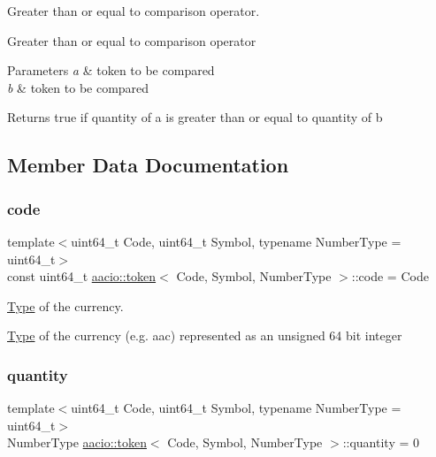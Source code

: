 Greater than or equal to comparison operator. 

Greater than or equal to comparison operator 
\begin{DoxyParams}{Parameters}
{\em a} & token to be compared \\
\hline
{\em b} & token to be compared \\
\hline
\end{DoxyParams}
\begin{DoxyReturn}{Returns}
true if quantity of a is greater than or equal to quantity of b 
\end{DoxyReturn}


\subsection{Member Data Documentation}
\mbox{\label{classaacio_1_1token_a40ec28cfd59953511a2fc98b76cc485a}} 
\subsubsection{\texorpdfstring{code}{code}}
{\footnotesize\ttfamily template$<$uint64\+\_\+t Code, uint64\+\_\+t Symbol, typename Number\+Type  = uint64\+\_\+t$>$ \\
const uint64\+\_\+t \mbox{\hyperlink{classaacio_1_1token}{aacio\+::token}}$<$ Code, Symbol, Number\+Type $>$\+::code = Code\hspace{0.3cm}{\ttfamily [static]}}



\mbox{\hyperlink{struct_type}{Type}} of the currency. 

\mbox{\hyperlink{struct_type}{Type}} of the currency (e.\+g. aac) represented as an unsigned 64 bit integer \mbox{\label{classaacio_1_1token_ab2c38b947ea6525e8a61c3b9cd4e711d}} 
\subsubsection{\texorpdfstring{quantity}{quantity}}
{\footnotesize\ttfamily template$<$uint64\+\_\+t Code, uint64\+\_\+t Symbol, typename Number\+Type  = uint64\+\_\+t$>$ \\
Number\+Type \mbox{\hyperlink{classaacio_1_1token}{aacio\+::token}}$<$ Code, Symbol, Number\+Type $>$\+::quantity = 0}



